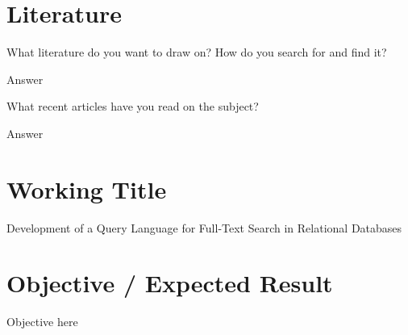 \section{Literature}
What literature do you want to draw on? How do you search for and find it?

Answer

What recent articles have you read on the subject?

Answer
\section{Working Title}
Development of a Query Language for Full-Text Search in Relational Databases
\section{Objective / Expected Result }
Objective here